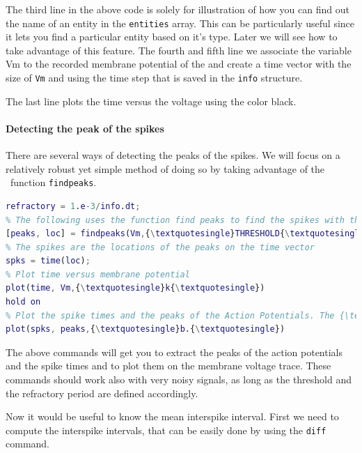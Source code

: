 The third line in the above code is solely for illustration of how you can find out the name of an entity in the \texttt{entities} array. This can be particularly useful since it lets you find a particular entity based on it's type. Later we will see how to take advantage of this feature.
The fourth and fifth line we associate the variable Vm to the recorded membrane potential of the  and create a time vector with the size of \texttt{Vm} and using the time step that is saved in the \texttt{info} structure.

The last line plots the time versus the voltage using the color black.

\paragraph{Detecting the peak of the spikes}

There are several ways of detecting the peaks of the spikes. We will focus on a relatively robust yet simple method of doing so by taking advantage of the \matlab\ function \texttt{findpeaks}.

\begin{lstlisting}[language=matlab,morekeywords={findpeaks,THRESHOLD,MINPEAKDISTANCE},escapeinside=\{\}]
% Define the refractory period of the peak detector (1ms); this can be useful when dealing with noisy signals.
refractory = 1.e-3/info.dt; 
% The following uses the function find peaks to find the spikes with threshold crossing at 0mV and a refractory period. 
[peaks, loc] = findpeaks(Vm,{\textquotesingle}THRESHOLD{\textquotesingle},0,{\textquotesingle}MINPEAKDISTANCE{\textquotesingle},refractory);
% The spikes are the locations of the peaks on the time vector
spks = time(loc);
% Plot time versus membrane potential
plot(time, Vm,{\textquotesingle}k{\textquotesingle})
hold on
% Plot the spike times and the peaks of the Action Potentials. The {\textquotesingle}hold on{\textquotesingle} command makes that the plots overlap.
plot(spks, peaks,{\textquotesingle}b.{\textquotesingle})
\end{lstlisting}

The above commands will get you to extract the peaks of the action potentials and the spike times and to plot them on the membrane voltage trace.
These commands should work also with very noisy signals, as long as the threshold and the refractory period are defined accordingly.

Now it would be useful to know the mean interspike interval. First we need to compute the interspike intervals, that can be easily done by using the \texttt{diff} command. 


